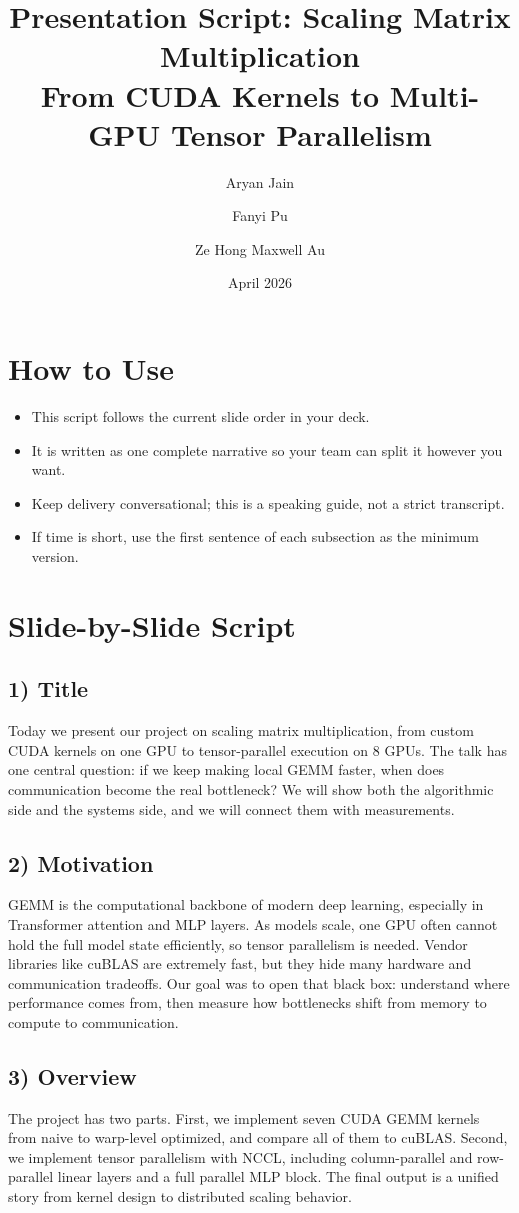 \documentclass[11pt]{article}
\title{Presentation Script: Scaling Matrix Multiplication\\
\large From CUDA Kernels to Multi-GPU Tensor Parallelism}
\author{Aryan Jain \and Fanyi Pu \and Ze Hong Maxwell Au}
\date{April 2026}
\begin{document}
\maketitle

\section*{How to Use}
\begin{itemize}[leftmargin=1.5em]
  \item This script follows the current slide order in your deck.
  \item It is written as one complete narrative so your team can split it however you want.
  \item Keep delivery conversational; this is a speaking guide, not a strict transcript.
  \item If time is short, use the first sentence of each subsection as the minimum version.
\end{itemize}

\section*{Slide-by-Slide Script}

\subsection*{1) Title}
Today we present our project on scaling matrix multiplication, from custom CUDA kernels on one GPU to tensor-parallel execution on 8 GPUs. The talk has one central question: if we keep making local GEMM faster, when does communication become the real bottleneck? We will show both the algorithmic side and the systems side, and we will connect them with measurements.

\subsection*{2) Motivation}
GEMM is the computational backbone of modern deep learning, especially in Transformer attention and MLP layers. As models scale, one GPU often cannot hold the full model state efficiently, so tensor parallelism is needed. Vendor libraries like cuBLAS are extremely fast, but they hide many hardware and communication tradeoffs. Our goal was to open that black box: understand where performance comes from, then measure how bottlenecks shift from memory to compute to communication.

\subsection*{3) Overview}
The project has two parts. First, we implement seven CUDA GEMM kernels from naive to warp-level optimized, and compare all of them to cuBLAS. Second, we implement tensor parallelism with NCCL, including column-parallel and row-parallel linear layers and a full parallel MLP block. The final output is a unified story from kernel design to distributed scaling behavior.
\end{document}
